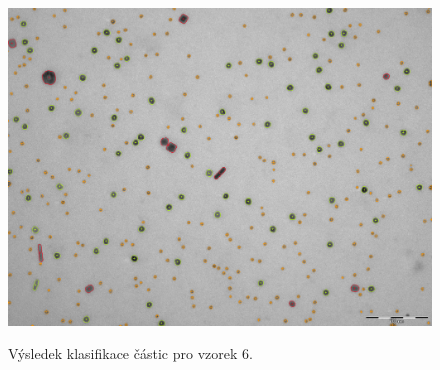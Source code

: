 \documentclass[11pt,twoside,a4paper,table]{book}
\begin{document}
\begin{figure}[h]
\center
\includegraphics[width=\textwidth]{figures/multi8_klasifikace.png}
\label{fig:class1}
\caption{Výsledek klasifikace částic pro vzorek 6.}
\end{figure}
\end{document}
